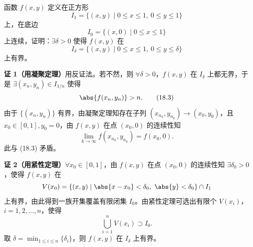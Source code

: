 \begin{xexample}[18.2.3]
函数 $f(x,y)$ 定义在正方形
\[
  I_1=\{(x,y)\mid0\le x\le1,\ 0\le y\le1\}
\]
上，在底边
\[
  I_0=\{(x,0)\mid0\le x\le1\}
\]
上连续，证明：$\exists\delta>0$ 使得 $f(x,y)$ 在
\[
  I_\delta=\{(x,y)\mid0\le x\le1,\ 0\le y\le\delta\}
\]
上有界。
\end{xexample}
\begin{xproof}
\textbf{证 1（用凝聚定理）}\quad 用反证法。若不然，则 $\forall\delta>0$，$f(x,y)$ 在 $I_\delta$ 上都无界，于是 $\exists(x_n,y_n)\in I_{1/n}$ 使得
\begin{equation}
  \abs{f(x_n,y_n)}>n.
  \tag{18.3}
\end{equation}
由于 $\{(x_n,y_n)\}$ 有界，由凝聚定理知存在子列 $(x_{n_k},y_{n_k})\to(x_0,y_0)$，且 $x_0\in[0,1],y_0=0$，由 $f(x,y)$ 在点 $(x_0,0)$ 的连续性知
\[
  \lim_{k\to\infty}f(x_{n_k},y_{n_k})=f(x_0,0).
\]
此与 (18.3) 矛盾。

\textbf{证 2（用紧性定理）}\quad $\forall x_0\in[0,1]$，由 $f(x,y)$ 在点 $(x_0,0)$ 的连续性知 $\exists\delta_0>0$，使得 $f(x,y)$ 在
\[
  V(x_0)=\{(x,y)\mid\abs{x-x_0}<\delta_0,\ \abs{y}<\delta_0\}\cap I_1
\]
上有界，由此得到一族开集覆盖有限闭集 $I_0$。由紧性定理可选出有限个 $V(x_i)$，$i=1,2,\ldots,n$，使得
\[
  \bigcup_{i=1}^nV(x_i)\supset I_0.
\]
取 $\delta=\min_{1\le i\le n}\{\delta_i\}$，则 $f(x,y)$ 在 $I_\delta$ 上有界。
\end{xproof}

